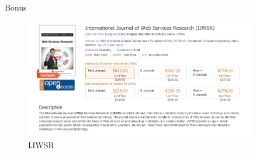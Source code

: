 \documentclass{beamer}		%
\begin{document}
\begin{frame}{Bonus}
\begin{figure}
    \centering
    \includegraphics[width=0.9\textwidth]{imgs/journal.png}
    \caption{IJWSR}
\end{figure}
\end{frame}
\end{document}
